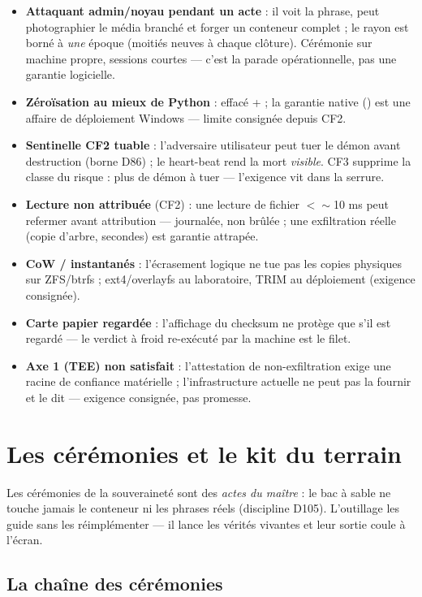 \begin{itemize}
\item \textbf{Attaquant admin/noyau pendant un acte} : il voit la phrase, peut
photographier le média branché et forger un conteneur complet ; le rayon est borné à
\emph{une} époque (moitiés neuves à chaque clôture). Cérémonie sur machine propre,
sessions courtes — c'est la parade opérationnelle, pas une garantie logicielle.
\item \textbf{Zéroïsation au mieux de Python} :  effacé +  ;
la garantie native () est une affaire de déploiement Windows —
limite consignée depuis CF2.
\item \textbf{Sentinelle CF2 tuable} : l'adversaire utilisateur peut tuer le démon avant
destruction (borne D86) ; le heart-beat rend la mort \emph{visible}. CF3 supprime la
classe du risque : plus de démon à tuer — l'exigence vit dans la serrure.
\item \textbf{Lecture non attribuée} (CF2) : une lecture de fichier $< \sim$10 ms peut
refermer avant attribution — journalée, non brûlée ; une exfiltration réelle (copie
d'arbre, secondes) est garantie attrapée.
\item \textbf{CoW / instantanés} : l'écrasement logique ne tue pas les copies physiques
sur ZFS/btrfs ; ext4/overlayfs au laboratoire, TRIM au déploiement (exigence
consignée).
\item \textbf{Carte papier regardée} : l'affichage du checksum ne protège que s'il est
regardé — le verdict à froid re-exécuté par la machine est le filet.
\item \textbf{Axe 1 (TEE) non satisfait} : l'attestation de non-exfiltration exige une
racine de confiance matérielle ; l'infrastructure actuelle ne peut pas la fournir et le
dit — exigence consignée, pas promesse.
\end{itemize}

\section{Les cérémonies et le kit du terrain}\label{sec:ceremonies}

Les cérémonies de la souveraineté sont des \emph{actes du maître} : le bac à sable ne
touche jamais le conteneur ni les phrases réels (discipline D105). L'outillage les guide
sans les réimplémenter — il lance les vérités vivantes et leur sortie coule à l'écran.

\subsection{La chaîne des cérémonies}\label{sec:chaineceremonies}

